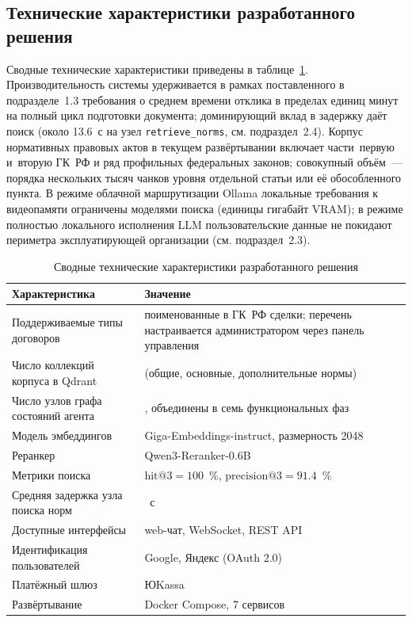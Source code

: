 \subsection{Технические характеристики разработанного решения}

Сводные технические характеристики приведены в таблице~\ref{tab:tech-summary}. Производительность системы удерживается в рамках поставленного в подразделе~1.3 требования о среднем времени отклика в пределах единиц минут на полный цикл подготовки документа; доминирующий вклад в задержку даёт поиск (около 13.6~с на узел \texttt{retrieve\_norms}, см. подраздел~2.4). Корпус нормативных правовых актов в текущем развёртывании включает части~первую и~вторую ГК~РФ и ряд профильных федеральных законов; совокупный объём~--- порядка нескольких тысяч чанков уровня отдельной статьи или её обособленного пункта. В режиме облачной маршрутизации Ollama локальные требования к видеопамяти ограничены моделями поиска (единицы гигабайт VRAM); в режиме полностью локального исполнения LLM пользовательские данные не покидают периметра эксплуатирующей организации (см. подраздел~2.3).

\begin{table}[H]
\caption{Сводные технические характеристики разработанного решения}
\label{tab:tech-summary}
\renewcommand{\arraystretch}{1.20}
\begin{tabularx}{\textwidth}{|>{\raggedright\arraybackslash}X|>{\raggedright\arraybackslash}X|} \hline
\textbf{Характеристика} & \textbf{Значение} \\ \hline
Поддерживаемые типы договоров & поименованные в ГК~РФ сделки; перечень настраивается администратором через панель управления \\ \hline
Число коллекций корпуса в Qdrant & 3 (общие, основные, дополнительные нормы) \\ \hline
Число узлов графа состояний агента & 21, объединены в семь функциональных фаз \\ \hline
Модель эмбеддингов & Giga-Embeddings-instruct, размерность 2048 \\ \hline
Реранкер & Qwen3-Reranker-0.6B \\ \hline
Метрики поиска & $\mathrm{hit}@3 = 100$~\%, $\mathrm{precision}@3 = 91.4$~\% \\ \hline
Средняя задержка узла поиска норм & 13.6~с \\ \hline
Доступные интерфейсы & web-чат, WebSocket, REST API \\ \hline
Идентификация пользователей & Google, Яндекс (OAuth 2.0) \\ \hline
Платёжный шлюз & ЮKassa \\ \hline
Развёртывание & Docker Compose, 7 сервисов \\ \hline
\end{tabularx}
\end{table}

